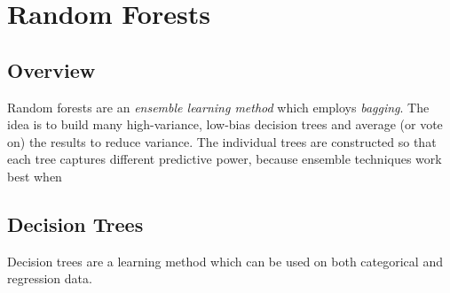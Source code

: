 \section{Random Forests}
\label{sec:random-forests}

\subsection{Overview}
\label{sec:rf-overview}

Random forests are an \emph{ensemble learning method} which employs \emph{bagging}. The idea is to build many high-variance, low-bias decision trees and average (or vote on) the results to reduce variance. The individual trees are constructed so that each tree captures different predictive power, because ensemble techniques work best when 

\subsection{Decision Trees}
\label{sec:decision-trees}

Decision trees are a learning method which can be used on both categorical and regression data.




